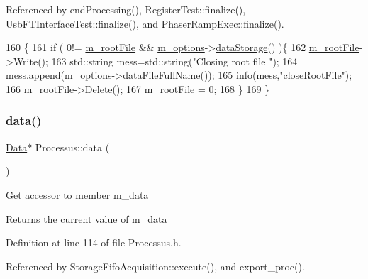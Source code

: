 Referenced by end\+Processing(), Register\+Test\+::finalize(), Usb\+F\+T\+Interface\+Test\+::finalize(), and Phaser\+Ramp\+Exec\+::finalize().


\begin{DoxyCode}
160                                 \{
161   \textcolor{keywordflow}{if} ( 0!= \hyperlink{classProcessus_a76114f8cf2111e910c323a7ae05a015d}{m\_rootFile} && \hyperlink{classProcessus_a74205f3c1e00c4448f7b3257c2351797}{m\_options}->\hyperlink{classOptions_aed7799d10139fa542055b982cb820192}{dataStorage}() )\{
162     \hyperlink{classProcessus_a76114f8cf2111e910c323a7ae05a015d}{m\_rootFile}->Write();
163         std::string mess=std::string(\textcolor{stringliteral}{"Closing root file "});
164         mess.append(\hyperlink{classProcessus_a74205f3c1e00c4448f7b3257c2351797}{m\_options}->\hyperlink{classOptions_ab1cd9f237e9c18fd72323c74565453f8}{dataFileFullName}());
165         \hyperlink{classObject_a644fd329ea4cb85f54fa6846484b84a8}{info}(mess,\textcolor{stringliteral}{"closeRootFile"});
166     \hyperlink{classProcessus_a76114f8cf2111e910c323a7ae05a015d}{m\_rootFile}->Delete();
167     \hyperlink{classProcessus_a76114f8cf2111e910c323a7ae05a015d}{m\_rootFile} = 0;
168   \}
169 \}
\end{DoxyCode}
\mbox{\label{classProcessus_a16e45f329fbce935aeef0ff3cb508228}} 
\subsubsection{\texorpdfstring{data()}{data()}\hspace{0.1cm}{\footnotesize\ttfamily [1/3]}}
{\footnotesize\ttfamily \hyperlink{classData}{Data}$\ast$ Processus\+::data (\begin{DoxyParamCaption}{ }\end{DoxyParamCaption})\hspace{0.3cm}{\ttfamily [inline]}}

Get accessor to member m\+\_\+data \begin{DoxyReturn}{Returns}
the current value of m\+\_\+data 
\end{DoxyReturn}


Definition at line 114 of file Processus.\+h.



Referenced by Storage\+Fifo\+Acquisition\+::execute(), and export\+\_\+proc().


